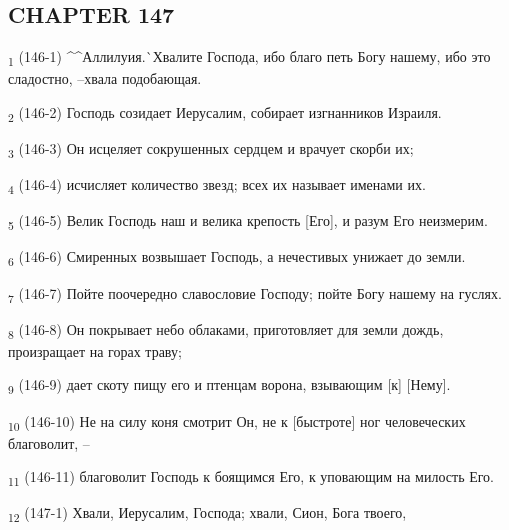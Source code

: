 \subsection{CHAPTER 147}
\begin{tcolorbox}
\textsubscript{1} (146-1) ^^Аллилуия.^^ Хвалите Господа, ибо благо петь Богу нашему, ибо это сладостно, --хвала подобающая.
\end{tcolorbox}
\begin{tcolorbox}
\textsubscript{2} (146-2) Господь созидает Иерусалим, собирает изгнанников Израиля.
\end{tcolorbox}
\begin{tcolorbox}
\textsubscript{3} (146-3) Он исцеляет сокрушенных сердцем и врачует скорби их;
\end{tcolorbox}
\begin{tcolorbox}
\textsubscript{4} (146-4) исчисляет количество звезд; всех их называет именами их.
\end{tcolorbox}
\begin{tcolorbox}
\textsubscript{5} (146-5) Велик Господь наш и велика крепость [Его], и разум Его неизмерим.
\end{tcolorbox}
\begin{tcolorbox}
\textsubscript{6} (146-6) Смиренных возвышает Господь, а нечестивых унижает до земли.
\end{tcolorbox}
\begin{tcolorbox}
\textsubscript{7} (146-7) Пойте поочередно славословие Господу; пойте Богу нашему на гуслях.
\end{tcolorbox}
\begin{tcolorbox}
\textsubscript{8} (146-8) Он покрывает небо облаками, приготовляет для земли дождь, произращает на горах траву;
\end{tcolorbox}
\begin{tcolorbox}
\textsubscript{9} (146-9) дает скоту пищу его и птенцам ворона, взывающим [к] [Нему].
\end{tcolorbox}
\begin{tcolorbox}
\textsubscript{10} (146-10) Не на силу коня смотрит Он, не к [быстроте] ног человеческих благоволит, --
\end{tcolorbox}
\begin{tcolorbox}
\textsubscript{11} (146-11) благоволит Господь к боящимся Его, к уповающим на милость Его.
\end{tcolorbox}
\begin{tcolorbox}
\textsubscript{12} (147-1) Хвали, Иерусалим, Господа; хвали, Сион, Бога твоего,
\end{tcolorbox}
